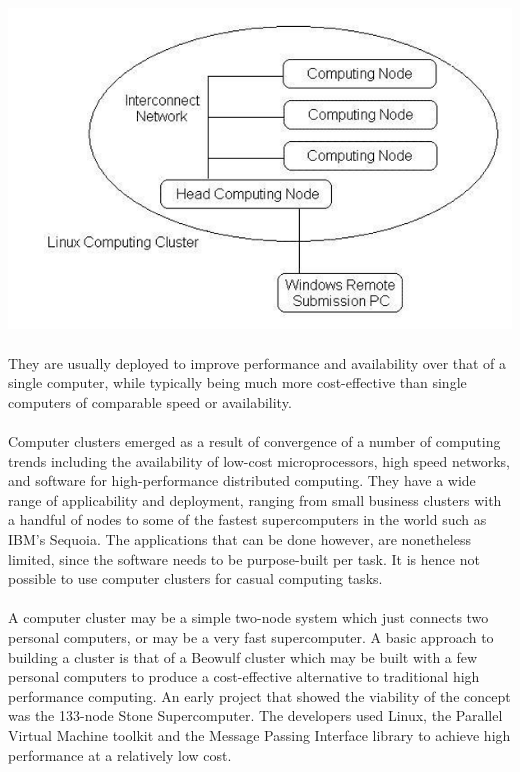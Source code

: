 \documentclass[10pt,a4paper]{article}
\begin{document}
\includegraphics[width = \textwidth]{clustertime_diag}
		
\paragraph{} They are usually deployed to improve performance and availability over that of a single computer, while typically being much more cost-effective than single computers of comparable speed or availability. 

\paragraph{} Computer clusters emerged as a result of convergence of a number of computing trends including the availability of low-cost microprocessors, high speed networks, and software for high-performance distributed computing. They have a wide range of applicability and deployment, ranging from small business clusters with a handful of nodes to some of the fastest supercomputers in the world such as IBM's Sequoia. The applications that can be done however, are nonetheless limited, since the software needs to be purpose-built per task. It is hence not possible to use computer clusters for casual computing tasks. 

\paragraph{} A computer cluster may be a simple two-node system which just connects two personal computers, or may be a very fast supercomputer. A basic approach to building a cluster is that of a Beowulf cluster which may be built with a few personal computers to produce a cost-effective alternative to traditional high performance computing. An early project that showed the viability of the concept was the 133-node Stone Supercomputer. The developers used Linux, the Parallel Virtual Machine toolkit and the Message Passing Interface library to achieve high performance at a relatively low cost. 
\end{document}
